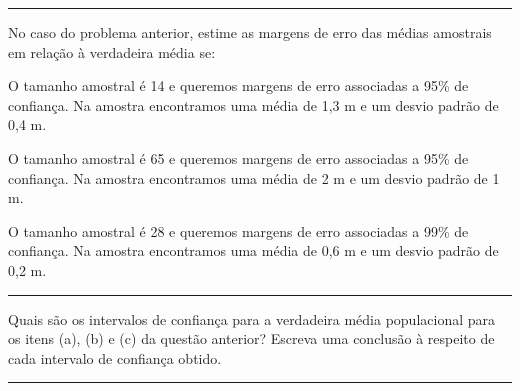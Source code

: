 \documentclass[a4paper,11pt,fleqn]{article}\usepackage[]{graphicx}\usepackage[]{color}
\theoremstyle{definition}
\begin{document}
\vspace{0.3cm}
\hrule
\vspace{0.3cm}

\begin{compactenum}[9.]
\item No caso do problema anterior, estime as margens de erro
  das médias amostrais em relação à verdadeira média se:
  \begin{compactenum}
  \item O tamanho amostral é 14 e queremos margens de erro associadas a
    95\% de confiança. Na amostra encontramos uma média de 1,3 m e um
    desvio padrão de 0,4 m.
  \item O tamanho amostral é 65 e queremos margens de erro
    associadas a 95\% de confiança. Na amostra encontramos uma média de
    2 m e um desvio padrão de 1 m.
  \item O tamanho amostral é 28 e queremos margens de erro
    associadas a 99\% de confiança. Na amostra encontramos uma média de
    0,6 m e um desvio padrão de 0,2 m.
  \end{compactenum}
\end{compactenum}

\vspace{0.3cm}
\hrule
\vspace{0.3cm}

\begin{compactenum}[10.]
\item Quais são os intervalos de confiança para a verdadeira média
  populacional para os itens (a), (b) e (c) da questão anterior?
  Escreva uma conclusão à respeito de cada intervalo de confiança
  obtido.
\end{compactenum}

\vspace{0.3cm}
\hrule
\vspace{0.3cm}

\end{document}
